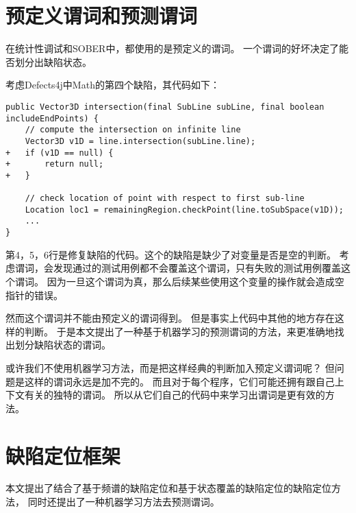 \section{预定义谓词和预测谓词}

在统计性调试和SOBER中，都使用的是预定义的谓词。
一个谓词的好坏决定了能否划分出缺陷状态。

考虑Defects4j中Math的第四个缺陷，其代码如下：
\lstset{language=Java}
\begin{lstlisting}
public Vector3D intersection(final SubLine subLine, final boolean includeEndPoints) {
    // compute the intersection on infinite line 
    Vector3D v1D = line.intersection(subLine.line);
+   if (v1D == null) {
+       return null;
+   } 

    // check location of point with respect to first sub-line
    Location loc1 = remainingRegion.checkPoint(line.toSubSpace(v1D));
    ... 
}
\end{lstlisting}

第4，5，6行是修复缺陷的代码。这个的缺陷是缺少了对变量是否是空的判断。
考虑谓词，会发现通过的测试用例都不会覆盖这个谓词，只有失败的测试用例覆盖这个谓词。
因为一旦这个谓词为真，那么后续某些使用这个变量的操作就会造成空指针的错误。

然而这个谓词并不能由预定义的谓词得到。
但是事实上代码中其他的地方存在这样的判断。
于是本文提出了一种基于机器学习的预测谓词的方法，来更准确地找出划分缺陷状态的谓词。

或许我们不使用机器学习方法，而是把这样经典的判断加入预定义谓词呢？
但问题是这样的谓词永远是加不完的。
而且对于每个程序，它们可能还拥有跟自己上下文有关的独特的谓词。
所以从它们自己的代码中来学习出谓词是更有效的方法。

\section{缺陷定位框架}
\label{sec:fl_frame}

本文提出了结合了基于频谱的缺陷定位和基于状态覆盖的缺陷定位的缺陷定位方法，
同时还提出了一种机器学习方法去预测谓词。

